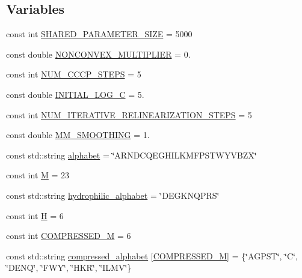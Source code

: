 \subsection*{Variables}
\begin{DoxyCompactItemize}
\item 
const int \hyperlink{namespace_c_o_n_t_r_a_l_i_g_n_ac55874d60f48cb644c7c65c79dcb2d54}{S\+H\+A\+R\+E\+D\+\_\+\+P\+A\+R\+A\+M\+E\+T\+E\+R\+\_\+\+S\+I\+Z\+E} = 5000
\item 
const double \hyperlink{namespace_c_o_n_t_r_a_l_i_g_n_a8574a561e08eaaaaf2caa651732430ef}{N\+O\+N\+C\+O\+N\+V\+E\+X\+\_\+\+M\+U\+L\+T\+I\+P\+L\+I\+E\+R} = 0.
\item 
const int \hyperlink{namespace_c_o_n_t_r_a_l_i_g_n_a3299389049ee38f5124c6da1d99fe81e}{N\+U\+M\+\_\+\+C\+C\+C\+P\+\_\+\+S\+T\+E\+P\+S} = 5
\item 
const double \hyperlink{namespace_c_o_n_t_r_a_l_i_g_n_aeee5c8bdae11d43911362af4a21348a8}{I\+N\+I\+T\+I\+A\+L\+\_\+\+L\+O\+G\+\_\+\+C} = 5.
\item 
const int \hyperlink{namespace_c_o_n_t_r_a_l_i_g_n_a6a3b0669d404c530e542b95d555ce89b}{N\+U\+M\+\_\+\+I\+T\+E\+R\+A\+T\+I\+V\+E\+\_\+\+R\+E\+L\+I\+N\+E\+A\+R\+I\+Z\+A\+T\+I\+O\+N\+\_\+\+S\+T\+E\+P\+S} = 5
\item 
const double \hyperlink{namespace_c_o_n_t_r_a_l_i_g_n_a5526bbb095dad1642772b911061636e9}{M\+M\+\_\+\+S\+M\+O\+O\+T\+H\+I\+N\+G} = 1.
\item 
const std\+::string \hyperlink{namespace_c_o_n_t_r_a_l_i_g_n_a2ff97191ea8854b1801441553af77857}{alphabet} = \char`\"{}A\+R\+N\+D\+C\+Q\+E\+G\+H\+I\+L\+K\+M\+F\+P\+S\+T\+W\+Y\+V\+B\+Z\+X\char`\"{}
\item 
const int \hyperlink{namespace_c_o_n_t_r_a_l_i_g_n_a7ce1fa1c6c36bd3bda0f8b508e6d8905}{M} = 23
\item 
const std\+::string \hyperlink{namespace_c_o_n_t_r_a_l_i_g_n_a01d91421b64dd93348343bcaa3b2bedc}{hydrophilic\+\_\+alphabet} = \char`\"{}D\+E\+G\+K\+N\+Q\+P\+R\+S\char`\"{}
\item 
const int \hyperlink{namespace_c_o_n_t_r_a_l_i_g_n_aaacc59b31308cc741658a6209609157b}{H} = 6
\item 
const int \hyperlink{namespace_c_o_n_t_r_a_l_i_g_n_a28d4592514704ed3e73d954d34bd4128}{C\+O\+M\+P\+R\+E\+S\+S\+E\+D\+\_\+\+M} = 6
\item 
const std\+::string \hyperlink{namespace_c_o_n_t_r_a_l_i_g_n_abc81d204924eda147b14d8d4da2b3f21}{compressed\+\_\+alphabet} \mbox{[}\hyperlink{namespace_c_o_n_t_r_a_l_i_g_n_a28d4592514704ed3e73d954d34bd4128}{C\+O\+M\+P\+R\+E\+S\+S\+E\+D\+\_\+\+M}\mbox{]} = \{\char`\"{}A\+G\+P\+S\+T\char`\"{}, \char`\"{}C\char`\"{}, \char`\"{}D\+E\+N\+Q\char`\"{}, \char`\"{}F\+W\+Y\char`\"{}, \char`\"{}H\+K\+R\char`\"{}, \char`\"{}I\+L\+M\+V\char`\"{}\}

\end{DoxyCompactItemize}
